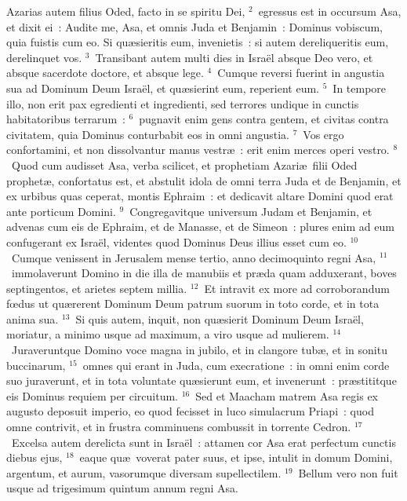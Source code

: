 \bchapter
\lettrine[lines=3,image=true,loversize=0.05,lraise=-0.03]{A}{}zarias autem filius Oded, facto in se spiritu Dei,
${}^{2}$~egressus est in occursum Asa, et dixit ei~: Audite me, Asa, et omnis Juda et Benjamin~: Dominus vobiscum, quia fuistis cum eo. Si qu\ae sieritis eum, invenietis~: si autem dereliqueritis eum, derelinquet vos.
${}^{3}$~Transibant autem multi dies in Isra\"el absque Deo vero, et absque sacerdote doctore, et absque lege.
${}^{4}$~Cumque reversi fuerint in angustia sua ad Dominum Deum Isra\"el, et qu\ae sierint eum, reperient eum.
${}^{5}$~In tempore illo, non erit pax egredienti et ingredienti, sed terrores undique in cunctis habitatoribus terrarum~:
${}^{6}$~pugnavit enim gens contra gentem, et civitas contra civitatem, quia Dominus conturbabit eos in omni angustia.
${}^{7}$~Vos ergo confortamini, et non dissolvantur manus vestr\ae~: erit enim merces operi vestro.
${}^{8}$~Quod cum audisset Asa, verba scilicet, et prophetiam Azari\ae\ filii Oded prophet\ae , confortatus est, et abstulit idola de omni terra Juda et de Benjamin, et ex urbibus quas ceperat, montis Ephraim~: et dedicavit altare Domini quod erat ante porticum Domini.
${}^{9}$~Congregavitque universum Judam et Benjamin, et advenas cum eis de Ephraim, et de Manasse, et de Simeon~: plures enim ad eum confugerant ex Isra\"el, videntes quod Dominus Deus illius esset cum eo.
${}^{10}$~Cumque venissent in Jerusalem mense tertio, anno decimoquinto regni Asa,
${}^{11}$~immolaverunt Domino in die illa de manubiis et pr\ae da quam adduxerant, boves septingentos, et arietes septem millia.
${}^{12}$~Et intravit ex more ad corroborandum fœdus ut qu\ae rerent Dominum Deum patrum suorum in toto corde, et in tota anima sua.
${}^{13}$~Si quis autem, inquit, non qu\ae sierit Dominum Deum Isra\"el, moriatur, a minimo usque ad maximum, a viro usque ad mulierem.
${}^{14}$~Juraveruntque Domino voce magna in jubilo, et in clangore tub\ae , et in sonitu buccinarum,
${}^{15}$~omnes qui erant in Juda, cum execratione~: in omni enim corde suo juraverunt, et in tota voluntate qu\ae sierunt eum, et invenerunt~: pr\ae stititque eis Dominus requiem per circuitum.
${}^{16}$~Sed et Maacham matrem Asa regis ex augusto deposuit imperio, eo quod fecisset in luco simulacrum Priapi~: quod omne contrivit, et in frustra comminuens combussit in torrente Cedron.
${}^{17}$~Excelsa autem derelicta sunt in Isra\"el~: attamen cor Asa erat perfectum cunctis diebus ejus,
${}^{18}$~eaque qu\ae\ voverat pater suus, et ipse, intulit in domum Domini, argentum, et aurum, vasorumque diversam supellectilem.
${}^{19}$~Bellum vero non fuit usque ad trigesimum quintum annum regni Asa.

